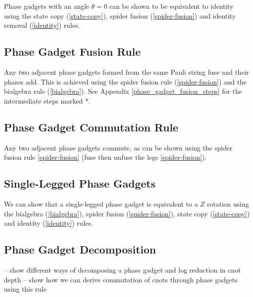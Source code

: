 Phase gadgets with an angle $\theta = 0$ can be shown to be equivalent to identity using the state copy (\ref{state-copy}), spider fusion (\ref{spider-fusion}) and identity removal (\ref{identity}) rules.



\subsection{Phase Gadget Fusion Rule}%
\label{phase-gadget-fusion}

Any two adjacent phase gadgets formed from the same Pauli string fuse and their phases add. This is achieved using the spider fusion rule (\ref{spider-fusion}) and the bialgebra rule (\ref{bialgebra}). See Appendix  \ref{phase_gadget_fusion_steps} for the intermediate steps marked *.



\subsection{Phase Gadget Commutation Rule}%
\label{phase-gadget-commutation}

Any two adjacent phase gadgets commute, as can be shown using the spider fusion rule \ref{spider-fusion} (fuse then unfuse the legs \ref{spider-fusion}).



\subsection{Single-Legged Phase Gadgets}%
\label{phase-gadget-single-leg}

We can show that a single-legged phase gadget is equivalent to a $Z$ rotation using the bialgebra (\ref{bialgebra}), spider fusion (\ref{spider-fusion}), state copy (\ref{state-copy}) and identity (\ref{identity}) rules.



\subsection{Phase Gadget Decomposition}%
\label{phase-gadget-decomposition}

-- show different ways of decomposing a phase gadget and log reduction in cnot depth
-- show how we can derive commutation of cnots through phase gadgets using this rule

